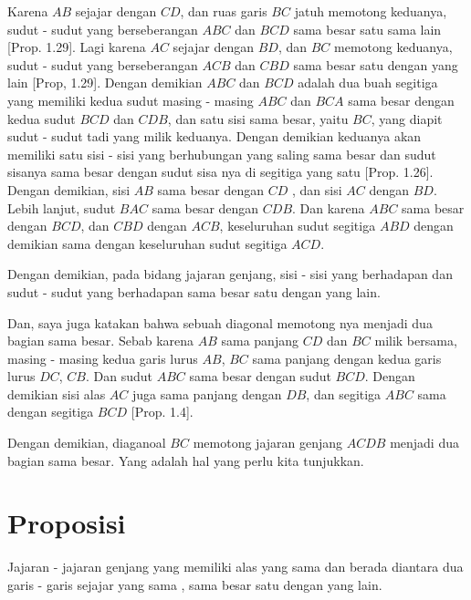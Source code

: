 \documentclass[a4paper]{book}
\begin{document}
Karena $AB$ sejajar dengan $CD$, dan ruas garis $BC$ jatuh memotong keduanya, 
sudut - sudut yang berseberangan $ABC$ dan $BCD$ sama besar satu sama lain 
[Prop. 1.29]. Lagi karena $AC$ sejajar dengan $BD$, dan $BC$ memotong keduanya, 
sudut - sudut yang berseberangan $ACB$ dan $CBD$ sama besar satu 
dengan yang lain [Prop, 1.29]. Dengan demikian $ABC$ dan $BCD$ adalah dua buah 
segitiga yang memiliki kedua sudut masing - masing $ABC$ dan $BCA$ sama besar 
dengan kedua sudut $BCD$ dan $CDB$, dan satu sisi sama besar, yaitu $BC$, yang
diapit sudut - sudut  tadi yang milik keduanya.
Dengan demikian keduanya akan memiliki satu sisi - sisi yang berhubungan yang saling
sama besar dan sudut sisanya sama besar dengan sudut sisa nya di segitiga yang satu
[Prop. 1.26].  Dengan demikian, sisi $AB$ sama besar dengan $CD$ , dan sisi 
$AC$ dengan $BD$. Lebih lanjut, sudut $BAC$ sama besar
dengan $CDB$. Dan karena $ABC$ sama besar dengan $BCD$, dan $CBD$ dengan $ACB$, 
keseluruhan sudut segitiga $ABD$ dengan demikian sama dengan keseluruhan  sudut 
segitiga $ACD$.

Dengan demikian, pada bidang jajaran genjang, sisi - sisi yang berhadapan dan
sudut - sudut yang berhadapan sama besar satu dengan yang lain.

Dan, saya juga katakan bahwa sebuah diagonal memotong nya menjadi dua bagian 
sama besar. Sebab karena $AB$ sama panjang $CD$ dan $BC$ milik bersama, masing - masing 
kedua garis lurus $AB$, $BC$ sama panjang dengan kedua garis lurus $DC$, $CB$. 
Dan sudut $ABC$ sama besar dengan sudut $BCD$. Dengan demikian sisi alas $AC$ 
juga sama panjang dengan $DB$, dan segitiga $ABC$ sama dengan segitiga $BCD$ 
[Prop. 1.4].

Dengan demikian, diaganoal $BC$ memotong jajaran genjang $ACDB$ menjadi dua 
bagian sama besar. Yang adalah hal yang perlu kita tunjukkan.

\section*{\centering Proposisi \thesection} 
Jajaran - jajaran genjang yang memiliki alas yang sama dan berada diantara dua
garis - garis sejajar yang sama , sama besar satu dengan yang lain.  
\end{document}
